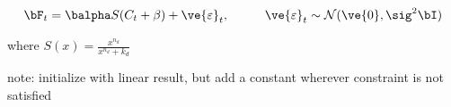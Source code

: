 \begin{align}
\bF_t &= \balpha S(C_t + \beta) +  \ve{\varepsilon}_t, \qquad &\ve{\varepsilon}_t \sim \mathcal{N}(\ve{0},\sig^2 \bI)
\end{align}

\noindent where $S(x)=\frac{x^{n_d}}{x^{n_d}+k_d}$

note: initialize with linear result, but add a constant wherever constraint is not satisfied